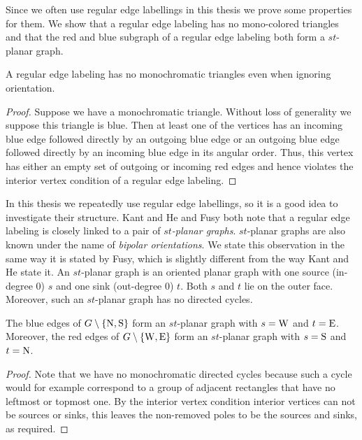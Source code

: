     Since we often use regular edge labellings in this thesis we prove some properties for them. We show that a regular edge labeling has no mono-colored triangles and that the red and blue subgraph of a regular edge labeling both form a $st$-planar graph.

  \begin{observation}
    \label{obs:rel:noMonoColoredTriangles}
    A regular edge labeling has no monochromatic triangles even when ignoring orientation.
  \end{observation}

  \begin{proof}
    Suppose we have a monochromatic triangle. Without loss of generality we suppose this triangle is blue. Then at least one of the vertices has an incoming blue edge followed directly by an outgoing blue edge or an outgoing blue edge followed directly by an incoming blue edge in its angular order. Thus, this vertex has either an empty set of outgoing or incoming red edges and hence violates the interior vertex condition of a regular edge labeling.
  \end{proof}

    In this thesis we repeatedly use regular edge labellings, so it is a good idea to investigate their structure.
    Kant and He \cite{Kant1997} and Fusy \cite{Fusy2009} both note that a regular edge labeling is closely linked to a pair of \emph{$st$-planar graphs}. $st$-planar graphs are also known under the name of \emph{bipolar orientations}.
    We state this observation in the same way it is stated by Fusy, which is slightly different from the way Kant and He state it.
    An $st$-planar graph is an oriented planar graph with one source (in-degree 0) $s$ and one sink (out-degree 0) $t$. Both $s$ and $t$ lie on the outer face. Moreover, such an $st$-planar graph has no directed cycles.

    \begin{observation}
      \label{obs:rel:stPlanarGraphs}
      The blue edges of $G\setminus \left\lbrace {\mathrm{N},\mathrm{S}} \right\rbrace$ form an $st$-planar graph with $s= \mathrm{W}$ and $t=\mathrm{E}$. Moreover, the red edges of $G\setminus \left\lbrace {\mathrm{W},\mathrm{E}} \right\rbrace$ form an $st$-planar graph with $s= \mathrm{S}$ and $t= \mathrm{N}$.
    \end{observation}
    \begin{proof}
      Note that we have no monochromatic directed cycles because such a cycle would for example correspond to a  group of adjacent rectangles that have  no leftmost or topmost one. By the interior vertex condition interior vertices can not be sources or sinks, this leaves the non-removed poles to be the sources and sinks, as required.
    \end{proof}

